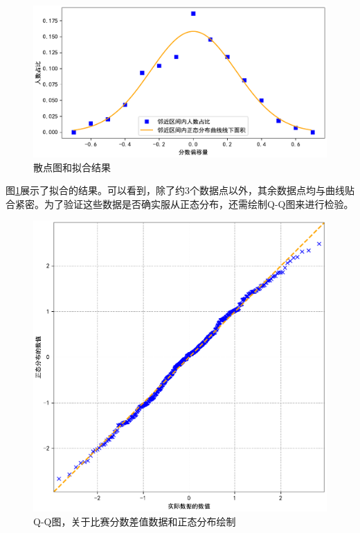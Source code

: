         \begin{figure}
            \centering
            \includegraphics[width=\textwidth]{fig/fittingOffsets.pdf}
            \caption{散点图和拟合结果}
            \label{fig:fittingOffsetsByNormalDistribution}
        \end{figure}

        \vspace{1.5ex}

        图\ref{fig:fittingOffsetsByNormalDistribution}展示了拟合的结果。可以看到，除了约$3$个数据点以外，其余数据点均与曲线贴合紧密。为了验证这些数据是否确实服从正态分布，还需绘制Q-Q图来进行检验。

        \begin{figure}
            \centering
            \includegraphics[width=\textwidth]{fig/QQPlot.pdf}
            \caption{Q-Q图，关于比赛分数差值数据和正态分布绘制}
            \label{fig:QQPlot}
        \end{figure}

